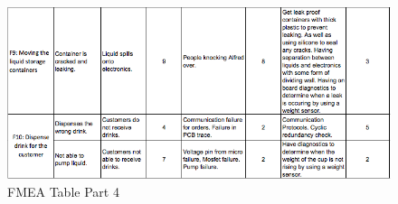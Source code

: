 \documentclass [10pt]{article}
\begin{document}
\begin{figure} [h!]
	\centering
	\includegraphics [scale = 0.7] {figures/FMEA_4.png}
	\caption{FMEA Table Part 4}
\end{figure}
\end{document}
